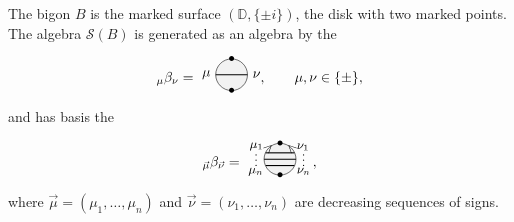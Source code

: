 \documentclass[pdftex]{sigma}%
\numberwithin{equation}{section}
\begin{document}
\begin{Example}
The bigon $B$ is the marked surface $(\mathbb{D},\{\pm i\})$, the disk with two marked points. The algebra $\mathscr{S}(B)$ is generated as an algebra by the
\[
{}_\mu\beta_\nu = \begin{tikzpicture}[scale = 0.8, baseline = -5pt]
\fill [gray!10] (0,0) circle (0.5);
\draw (0,0) circle (0.5);
\node at (0,-0.5){\small $\bullet$};
\node at (0,0.5){\small $\bullet$};
\draw [thick] (-0.5,0) node[left]{$\mu$} -- (0.5,0) node[right]{$\nu$};
\end{tikzpicture}\!\!, \qquad
\mu,\nu \in \{\pm\},
\]
and has basis the
\[_{\vec{\mu}}\beta_{\vec{\nu}} = \begin{tikzpicture}[scale = 0.8, baseline = -5pt]
\fill [gray!10] (0,0) circle (0.5);
\draw (0,0) circle (0.5);
\node[rotate = 45] at (135:0.5) {\small $>$};
\node[rotate = -45] at (45:0.5) {\small $<$};
\node at (0,-0.5){\small $\bullet$};
\node at (0,0.5){\small $\bullet$};
\draw [thick] (-0.5,0) node[rotate = 90, above]{\footnotesize $\cdots$} -- (0.5,0) node[rotate = 90, below]{\footnotesize $\cdots$};
\draw [thick] (-0.45,-0.2) node[below left = -2pt]{\small $\mu_n$} -- (0.45,-0.2) node[below right = -2pt]{\small $\nu_n$};
\draw [thick] (-0.45,0.2) node[above left = -2pt]{\small $\mu_1$} -- (0.45,0.2) node[above right = -2pt]{\small $\nu_1$};
\end{tikzpicture}\!,
\]
where $\vec{\mu} = (\mu_1,\ldots,\mu_n)$ and $\vec{\nu} = (\nu_1,\ldots,\nu_n)$ are decreasing sequences of signs.


\end{Example}
\end{document}
